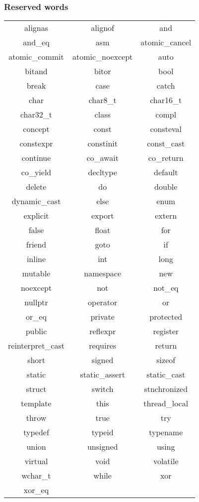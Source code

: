 \subsubsection{Reserved words}
\begin{center}
\begin{tabular}{||c|c|c||}
\hline
alignas & alignof & and \\
and\_eq & asm & atomic\_cancel \\
atomic\_commit & atomic\_noexcept & auto \\
bitand & bitor & bool \\
break & case & catch \\
char & char8\_t & char16\_t \\
char32\_t & class & compl \\
concept & const & consteval \\
constexpr & constinit & const\_cast \\
continue & co\_await & co\_return \\
co\_yield & decltype & default \\
delete & do & double \\
dynamic\_cast & else & enum \\
explicit & export & extern \\
false & float & for \\
friend & goto & if \\
inline & int & long \\
mutable & namespace & new \\
noexcept & not & not\_eq \\
nullptr & operator & or \\
or\_eq & private & protected \\
public & reflexpr & register \\
reinterpret\_cast & requires & return \\
short & signed & sizeof \\
static & static\_assert & static\_cast \\
struct & switch & stnchronized \\
template & this & thread\_local \\
throw & true & try \\
typedef & typeid & typename \\
union & unsigned & using \\
virtual & void & volatile \\
wchar\_t & while & xor \\
xor\_eq &  &  \\
\hline
\end{tabular}
\end{center}

